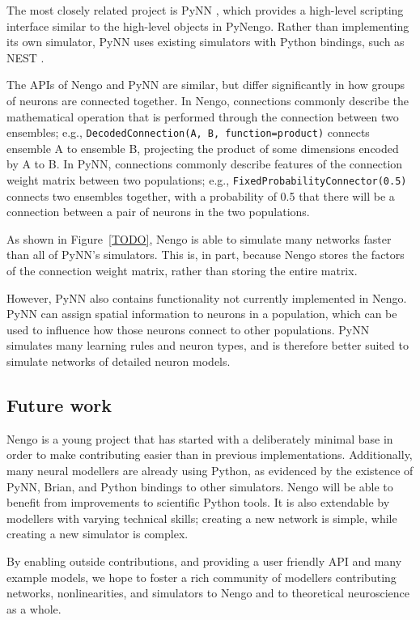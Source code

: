 \documentclass{frontiersSCNS}
\begin{document}
The most closely related project is PyNN
\cite{TODO},
which provides a high-level scripting
interface similar to the
high-level objects in PyNengo.
Rather than implementing its
own simulator, PyNN uses existing
simulators with Python bindings,
such as NEST \cite{TODO}.

The APIs of Nengo and PyNN are similar,
but differ significantly
in how groups of neurons are connected together.
In Nengo, connections commonly describe
the mathematical operation that is performed
through the connection between
two ensembles;
e.g., \texttt{DecodedConnection(A, B,
function=product)} connects ensemble A
to ensemble B, projecting the product of
some dimensions encoded by A to B.
In PyNN, connections commonly describe
features of the connection weight matrix
between two populations;
e.g., \texttt{FixedProbabilityConnector(0.5)}
connects two ensembles together,
with a probability of 0.5
that there will be a connection
between a pair of neurons in the two populations.

As shown in Figure~\ref{TODO},
Nengo is able to simulate many networks
faster than all of PyNN's simulators.
This is, in part,
because Nengo stores the factors
of the connection weight matrix,
rather than storing the entire matrix.

However, PyNN also contains functionality
not currently implemented in Nengo.
PyNN can assign spatial information
to neurons in a population,
which can be used to influence
how those neurons connect to other populations.
PyNN simulates many learning rules
and neuron types,
and is therefore better suited to
simulate networks of detailed neuron models.

\subsection{Future work}

Nengo is a young project that
has started with a deliberately minimal base
in order to make contributing easier than in
previous implementations.
Additionally, many neural modellers
are already using Python,
as evidenced by the existence of
PyNN, Brian, and Python bindings to other simulators.
Nengo will be able to benefit
from improvements to scientific Python tools.
It is also extendable by modellers with
varying technical skills;
creating a new network is simple,
while creating a new simulator is complex.

By enabling outside contributions,
and providing a user friendly API
and many example models,
we hope to foster a rich community of modellers
contributing networks, nonlinearities,
and simulators to Nengo
and to theoretical neuroscience
as a whole.
\end{document}
